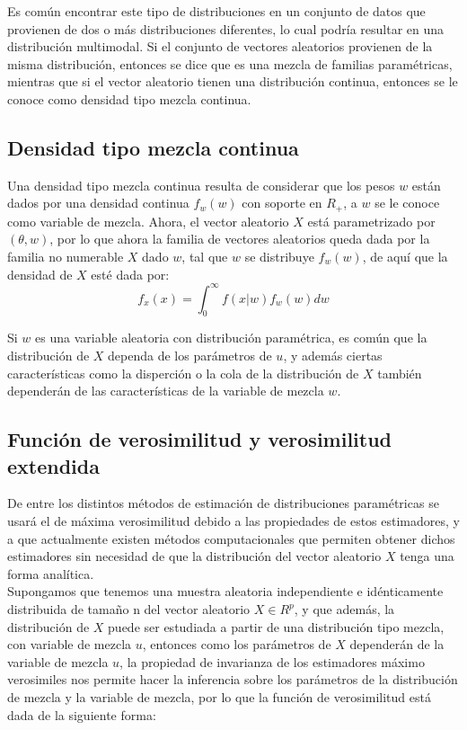\documentclass[11pt]{book}
\begin{document}
Es común encontrar este tipo de distribuciones en un conjunto de datos que provienen de dos o más distribuciones diferentes, lo cual podría resultar en una distribución multimodal. Si el conjunto de vectores aleatorios provienen de la misma distribución, entonces se dice que es una mezcla de familias paramétricas, mientras que si el vector aleatorio tienen una distribución continua, entonces se le conoce como densidad tipo mezcla continua.\\

\subsection*{Densidad tipo mezcla continua}
Una densidad tipo mezcla continua resulta de considerar que los pesos $w$ están dados por una densidad continua $f_{w}(w)$ con soporte en $R_{+}$, a $w$ se le conoce como variable de mezcla. Ahora, el vector aleatorio $X$ está parametrizado por $(\theta,w)$, por lo que ahora la familia de vectores aleatorios queda dada por la familia no numerable  $ X$ dado $w$, tal que $w$ se distribuye $f_{w}(w) $, de aquí que la densidad de $X$ esté dada por:\\
\begin{equation*}
f_{x}(x)=\int_{0}^{\infty}f(x|w)f_{w}(w)dw 
\end{equation*}


Si $w$ es una variable aleatoria con distribución paramétrica, es común que la distribución de $X$ dependa de los parámetros de $u$, y además ciertas características como la disperción o la cola de la distribución de $X$ también dependerán de las características de la variable de mezcla $w$.\\



\subsection*{Función de verosimilitud y verosimilitud extendida}

 De entre los distintos métodos de estimación de distribuciones paramétricas se usará el de máxima verosimilitud debido a las propiedades de estos estimadores, y a que actualmente existen métodos computacionales que permiten obtener dichos estimadores sin necesidad de que la distribución del vector aleatorio $X$ tenga una forma analítica.\\

Supongamos que tenemos una muestra aleatoria independiente e idénticamente distribuida de tamaño n del vector aleatorio $X\in R^{p}$, y que además, la distribución de $X$ puede ser estudiada a partir de una distribución tipo mezcla, con variable de mezcla $u$, entonces como los parámetros de $X$ dependerán de la variable de mezcla $u$, la propiedad de invarianza de los estimadores máximo verosimiles nos permite hacer la inferencia sobre los parámetros de la distribución de mezcla y la variable de mezcla, por lo que la función de verosimilitud está dada de la siguiente forma:\\
\end{document}
